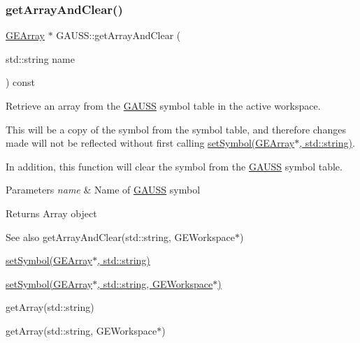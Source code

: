 \subsubsection{\texorpdfstring{get\+Array\+And\+Clear()}{getArrayAndClear()}\hspace{0.1cm}{\footnotesize\ttfamily [1/2]}}
{\footnotesize\ttfamily \hyperlink{class_g_e_array}{G\+E\+Array} $\ast$ G\+A\+U\+S\+S\+::get\+Array\+And\+Clear (\begin{DoxyParamCaption}\item[{std\+::string}]{name }\end{DoxyParamCaption}) const}



Retrieve an array from the \hyperlink{class_g_a_u_s_s}{G\+A\+U\+SS} symbol table in the active workspace. 

This will be a copy of the symbol from the symbol table, and therefore changes made will not be reflected without first calling \hyperlink{class_g_a_u_s_s_a328c6fadd097c46b0651d1985c12759d}{set\+Symbol(\+G\+E\+Array$\ast$, std\+::string)}.

In addition, this function will clear the symbol from the \hyperlink{class_g_a_u_s_s}{G\+A\+U\+SS} symbol table.


\begin{DoxyParams}{Parameters}
{\em name} & Name of \hyperlink{class_g_a_u_s_s}{G\+A\+U\+SS} symbol \\
\hline
\end{DoxyParams}
\begin{DoxyReturn}{Returns}
Array object
\end{DoxyReturn}
\begin{DoxySeeAlso}{See also}
get\+Array\+And\+Clear(std\+::string, G\+E\+Workspace$\ast$) 

\hyperlink{class_g_a_u_s_s_a328c6fadd097c46b0651d1985c12759d}{set\+Symbol(\+G\+E\+Array$\ast$, std\+::string)} 

\hyperlink{class_g_a_u_s_s_a0b47905610cb724bd9d6b69ef57ddc60}{set\+Symbol(\+G\+E\+Array$\ast$, std\+::string, G\+E\+Workspace$\ast$)} 

get\+Array(std\+::string) 

get\+Array(std\+::string, G\+E\+Workspace$\ast$) 
\end{DoxySeeAlso}
\mbox{\label{class_g_a_u_s_s_a38de5e7c3153f8948ca7d463248e5d80}} 

